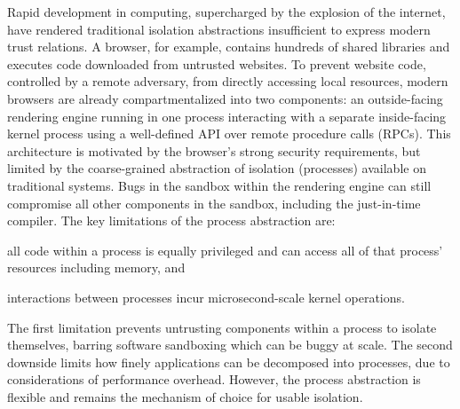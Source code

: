 Rapid development in computing, supercharged by the explosion of the internet,
have rendered traditional isolation abstractions insufficient to express modern
trust relations.
A browser, for example, contains hundreds of shared libraries and executes
code downloaded from untrusted websites.
To prevent website code, controlled by a remote adversary, from directly 
accessing local resources, modern browsers are already compartmentalized into
two components: 
an outside-facing rendering engine running in one process 
interacting with 
a separate inside-facing kernel process
using a well-defined API over remote procedure calls (RPCs).
This architecture is motivated by the browser's strong security requirements,
but limited by the coarse-grained abstraction of isolation (processes)
available on traditional systems.
Bugs in the sandbox within the rendering engine can still compromise all
other components in the sandbox, including the just-in-time compiler.
The key limitations of the process abstraction are:
\begin{inparaenum}
      \item all code within a process is equally privileged and can access all
            of that process' resources including memory, and
      \item interactions between processes incur microsecond-scale kernel
            operations.
\end{inparaenum}
The first limitation prevents untrusting components within a process to
isolate themselves, barring software sandboxing which can be buggy at scale.
The second downside limits how finely applications can be decomposed into
processes, due to considerations of performance overhead.
However, the process abstraction is flexible and remains the mechanism 
of choice for usable isolation.

